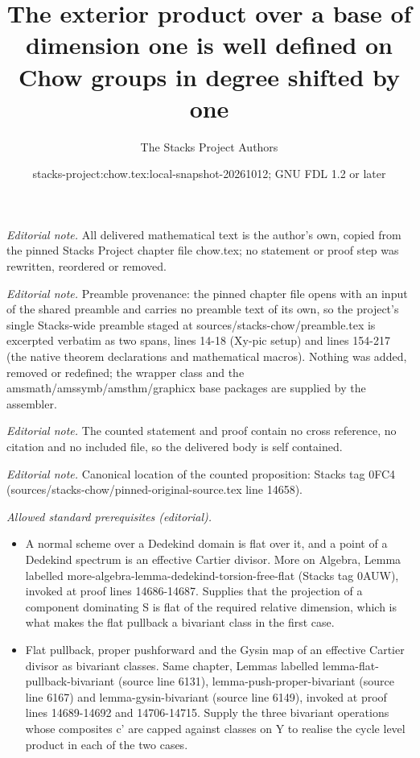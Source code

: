 \documentclass[10pt,a4paper]{amsart}
\title{The exterior product over a base of dimension one is well defined on Chow groups in degree shifted by one}
\author{The Stacks Project Authors}
\date{stacks-project:chow.tex:local-snapshot-20261012; GNU FDL 1.2 or later}
\theoremstyle{plain}
\theoremstyle{definition}
\theoremstyle{remark}
\numberwithin{equation}{subsection}
\begin{document}
\maketitle
\noindent\textit{Editorial note.} All delivered mathematical text is the author's own, copied from the pinned Stacks Project chapter file chow.tex; no statement or proof step was rewritten, reordered or removed.\par\medskip
\noindent\textit{Editorial note.} Preamble provenance: the pinned chapter file opens with an input of the shared preamble and carries no preamble text of its own, so the project's single Stacks-wide preamble staged at sources/stacks-chow/preamble.tex is excerpted verbatim as two spans, lines 14-18 (Xy-pic setup) and lines 154-217 (the native theorem declarations and mathematical macros). Nothing was added, removed or redefined; the wrapper class and the amsmath/amssymb/amsthm/graphicx base packages are supplied by the assembler.\par\medskip
\noindent\textit{Editorial note.} The counted statement and proof contain no cross reference, no citation and no included file, so the delivered body is self contained.\par\medskip
\noindent\textit{Editorial note.} Canonical location of the counted proposition: Stacks tag 0FC4 (sources/stacks-chow/pinned-original-source.tex line 14658).\par\medskip
\noindent\textit{Allowed standard prerequisites (editorial).}\begin{itemize}
\item A normal scheme over a Dedekind domain is flat over it, and a point of a Dedekind spectrum is an effective Cartier divisor. More on Algebra, Lemma labelled more-algebra-lemma-dedekind-torsion-free-flat (Stacks tag 0AUW), invoked at proof lines 14686-14687. Supplies that the projection of a component dominating S is flat of the required relative dimension, which is what makes the flat pullback a bivariant class in the first case.
\item Flat pullback, proper pushforward and the Gysin map of an effective Cartier divisor as bivariant classes. Same chapter, Lemmas labelled lemma-flat-pullback-bivariant (source line 6131), lemma-push-proper-bivariant (source line 6167) and lemma-gysin-bivariant (source line 6149), invoked at proof lines 14689-14692 and 14706-14715. Supply the three bivariant operations whose composites c' are capped against classes on Y to realise the cycle level product in each of the two cases.
\end{itemize}\medskip
\end{document}
